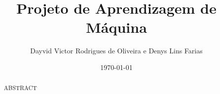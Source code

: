 \documentclass[11pt,a4paper,openright]{report}
\begin{document}
\title{Projeto de Aprendizagem de Máquina}
\author{Dayvid Victor Rodrigues de Oliveira e Denys Lins Farias}
\date{\today}

\maketitle


\begin{abstract}
ABSTRACT
\end{abstract}

\tableofcontents

\listoftables
\listoffigures

\cleardoublepage
\setcounter{page}{1}








\end{document}
